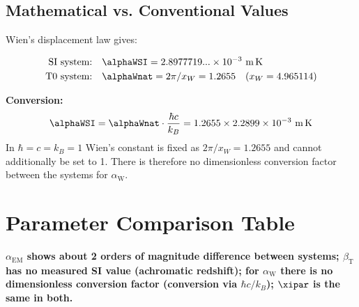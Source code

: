 	\subsection{Mathematical vs. Conventional Values}
	\label{subsec:wien_values}
	
	Wien's displacement law gives:
	
	\begin{align}
		\text{SI system:} \quad &\alphaWSI = 2.8977719...\times10^{-3}~\text{m\,K} \\
		\text{T0 system:} \quad &\alphaWnat = 2\pi/x_W = 1.2655 \quad (x_W = 4.965114)
	\end{align}
	
	\textbf{Conversion:}
	$$\alphaWSI = \alphaWnat\cdot\frac{\hbar c}{k_B} = 1.2655 \times 2.2899\times10^{-3}~\text{m\,K}$$
	In $\hbar = c = k_B = 1$ Wien's constant is fixed as $2\pi/x_W = 1.2655$ and cannot additionally be set to 1. There is therefore no dimensionless conversion factor between the systems for $\alpha_{\text{W}}$.
	
	\section{Parameter Comparison Table}
	\label{sec:parameter_comparison}
	
	\begin{table}[htbp]
		\centering

		\caption{Systematic parameter differences between unit systems}
		\label{tab:parameter_comparison}
	\end{table}
	
	\textbf{$\alpha_{\text{EM}}$ shows about 2 orders of magnitude difference between systems; $\beta_{\text{T}}$ has no measured SI value (achromatic redshift); for $\alpha_{\text{W}}$ there is no dimensionless conversion factor (conversion via $\hbar c/k_B$); $\xipar$ is the same in both.}
	
